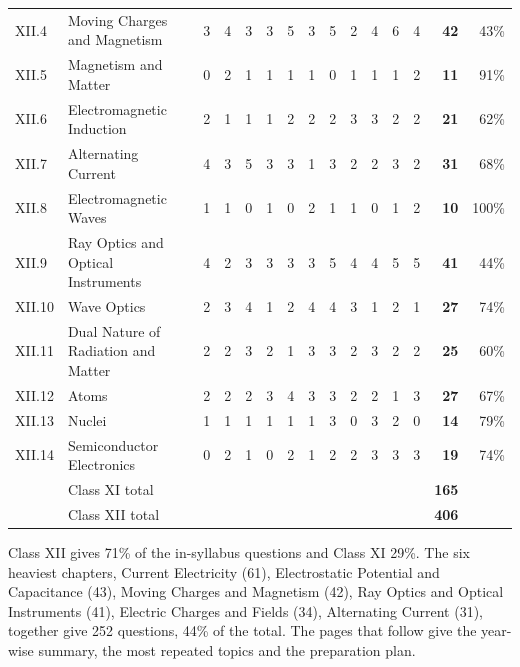 {\begin{tabularx}{\linewidth}{@{}l>{\raggedright\arraybackslash}X*{11}{c}rr@{}}
XII.4 & Moving Charges and Magnetism & 3 & 4 & 3 & 3 & 5 & 3 & 5 & 2 & 4 & 6 & 4 & \textbf{42} & 43\%\\
XII.5 & Magnetism and Matter & 0 & 2 & 1 & 1 & 1 & 1 & 0 & 1 & 1 & 1 & 2 & \textbf{11} & 91\%\\
XII.6 & Electromagnetic Induction & 2 & 1 & 1 & 1 & 2 & 2 & 2 & 3 & 3 & 2 & 2 & \textbf{21} & 62\%\\
XII.7 & Alternating Current & 4 & 3 & 5 & 3 & 3 & 1 & 3 & 2 & 2 & 3 & 2 & \textbf{31} & 68\%\\
XII.8 & Electromagnetic Waves & 1 & 1 & 0 & 1 & 0 & 2 & 1 & 1 & 0 & 1 & 2 & \textbf{10} & 100\%\\
XII.9 & Ray Optics and Optical Instruments & 4 & 2 & 3 & 3 & 3 & 3 & 5 & 4 & 4 & 5 & 5 & \textbf{41} & 44\%\\
XII.10 & Wave Optics & 2 & 3 & 4 & 1 & 2 & 4 & 4 & 3 & 1 & 2 & 1 & \textbf{27} & 74\%\\
XII.11 & Dual Nature of Radiation and Matter & 2 & 2 & 3 & 2 & 1 & 3 & 3 & 2 & 3 & 2 & 2 & \textbf{25} & 60\%\\
XII.12 & Atoms & 2 & 2 & 2 & 3 & 4 & 3 & 3 & 2 & 2 & 1 & 3 & \textbf{27} & 67\%\\
XII.13 & Nuclei & 1 & 1 & 1 & 1 & 1 & 1 & 3 & 0 & 3 & 2 & 0 & \textbf{14} & 79\%\\
XII.14 & Semiconductor Electronics & 0 & 2 & 1 & 0 & 2 & 1 & 2 & 2 & 3 & 3 & 3 & \textbf{19} & 74\%\\
\midrule & Class XI total & \multicolumn{11}{c}{} & \textbf{165} & \\
& Class XII total & \multicolumn{11}{c}{} & \textbf{406} & \\\bottomrule
\end{tabularx}}\par\medskip
{\small Class XII gives 71\% of the in-syllabus questions and Class XI 29\%. The six heaviest chapters, Current Electricity (61), Electrostatic Potential and Capacitance (43), Moving Charges and Magnetism (42), Ray Optics and Optical Instruments (41), Electric Charges and Fields (34), Alternating Current (31), together give 252 questions, 44\% of the total. The pages that follow give the year-wise summary, the most repeated topics and the preparation plan.}\par

